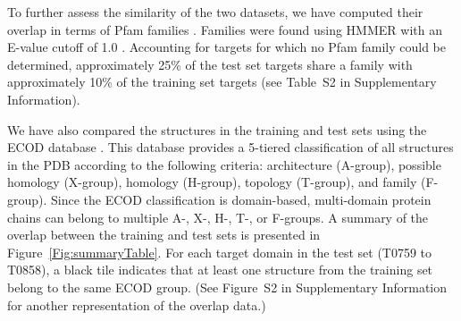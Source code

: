 \documentclass{bioinfo}
\begin{document}
To further assess the similarity of the two datasets, we have computed
their overlap in terms of Pfam families \citep{finn2016pfam}. 
Families were found using HMMER \citep{finn2015hmmer} with an E-value
cutoff of 1.0 \citep{finn2016pfam}.  Accounting for targets for which
no Pfam family could be determined, approximately 25\% of the test set
targets share a family with approximately 10\% of the training set
targets (see Table~S2 in Supplementary Information).

We have also compared the structures in the training and test sets
using the ECOD database \citep{cheng2014ecod}. This database provides a
5-tiered classification of all structures in the PDB
according to the following criteria:
architecture (A-group), possible homology (X-group), homology
(H-group), topology (T-group), and family (F-group).  Since the ECOD
classification is domain-based, multi-domain protein chains can belong
to multiple A-, X-, H-, T-, or F-groups.
%
A summary of the overlap between the training and test sets is
presented in Figure~\ref{Fig:summaryTable}. For each target domain in
the test set (T0759 to T0858), a black tile indicates that at least
one structure from the training set belong to the same ECOD
group. (See Figure~S2 in Supplementary Information for another
representation of the overlap data.)
\end{document}
